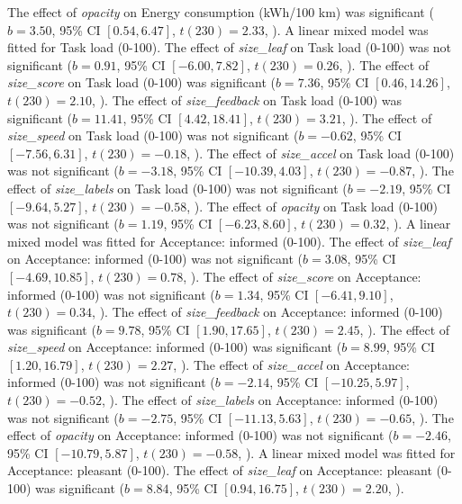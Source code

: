 The effect of \textit{opacity} on Energy consumption (kWh/100 km) was significant ($b = 3.50$, 95\% CI $[0.54, 6.47]$, $t(230) = 2.33$, ).
A linear mixed model was fitted for Task load (0-100).
The effect of \textit{size\_leaf} on Task load (0-100) was not significant ($b = 0.91$, 95\% CI $[-6.00, 7.82]$, $t(230) = 0.26$, ).
The effect of \textit{size\_score} on Task load (0-100) was significant ($b = 7.36$, 95\% CI $[0.46, 14.26]$, $t(230) = 2.10$, ).
The effect of \textit{size\_feedback} on Task load (0-100) was significant ($b = 11.41$, 95\% CI $[4.42, 18.41]$, $t(230) = 3.21$, ).
The effect of \textit{size\_speed} on Task load (0-100) was not significant ($b = -0.62$, 95\% CI $[-7.56, 6.31]$, $t(230) = -0.18$, ).
The effect of \textit{size\_accel} on Task load (0-100) was not significant ($b = -3.18$, 95\% CI $[-10.39, 4.03]$, $t(230) = -0.87$, ).
The effect of \textit{size\_labels} on Task load (0-100) was not significant ($b = -2.19$, 95\% CI $[-9.64, 5.27]$, $t(230) = -0.58$, ).
The effect of \textit{opacity} on Task load (0-100) was not significant ($b = 1.19$, 95\% CI $[-6.23, 8.60]$, $t(230) = 0.32$, ).
A linear mixed model was fitted for Acceptance: informed (0-100).
The effect of \textit{size\_leaf} on Acceptance: informed (0-100) was not significant ($b = 3.08$, 95\% CI $[-4.69, 10.85]$, $t(230) = 0.78$, ).
The effect of \textit{size\_score} on Acceptance: informed (0-100) was not significant ($b = 1.34$, 95\% CI $[-6.41, 9.10]$, $t(230) = 0.34$, ).
The effect of \textit{size\_feedback} on Acceptance: informed (0-100) was significant ($b = 9.78$, 95\% CI $[1.90, 17.65]$, $t(230) = 2.45$, ).
The effect of \textit{size\_speed} on Acceptance: informed (0-100) was significant ($b = 8.99$, 95\% CI $[1.20, 16.79]$, $t(230) = 2.27$, ).
The effect of \textit{size\_accel} on Acceptance: informed (0-100) was not significant ($b = -2.14$, 95\% CI $[-10.25, 5.97]$, $t(230) = -0.52$, ).
The effect of \textit{size\_labels} on Acceptance: informed (0-100) was not significant ($b = -2.75$, 95\% CI $[-11.13, 5.63]$, $t(230) = -0.65$, ).
The effect of \textit{opacity} on Acceptance: informed (0-100) was not significant ($b = -2.46$, 95\% CI $[-10.79, 5.87]$, $t(230) = -0.58$, ).
A linear mixed model was fitted for Acceptance: pleasant (0-100).
The effect of \textit{size\_leaf} on Acceptance: pleasant (0-100) was significant ($b = 8.84$, 95\% CI $[0.94, 16.75]$, $t(230) = 2.20$, ).
